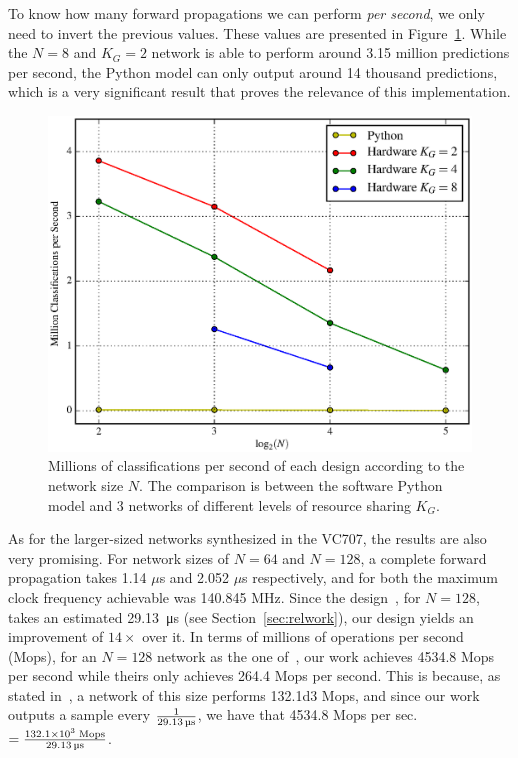 \documentclass{IEEEtran}
\begin{document}
To know how many forward propagations we can perform \emph{per second},
we only need to invert the previous values. These values are presented in Figure~\ref{fig:Mclass-psec}. While the $N=8$ and $K_G=2$ network is able to
perform around 3.15 million predictions per second, the Python model can only output around 14 thousand predictions, which is a very significant result that
proves the relevance of this implementation.

\begin{figure}
    \centering
    \includegraphics[width=\linewidth]{figures/Mclass-psec.eps}
    \caption[Millions of classifications per second of each design according to the network size $N$]{Millions of classifications per second of each design according to the network size $N$. The comparison is between the software Python model and 3 networks of different levels of resource sharing $K_G$.}
    \label{fig:Mclass-psec}
\end{figure}

As for the larger-sized networks synthesized in the VC707, the results are also very promising. For network sizes of $N=64$ and $N=128$, a complete
forward propagation takes 1.14 $\mu$s and 2.052 $\mu$s respectively, and for both the maximum clock frequency achievable was 140.845 MHz. Since the
design~\cite{Chang15}, for $N=128$, takes an estimated \SI{29.13}{\micro\second} (see Section~\ref{sec:relwork}), our design yields an improvement of $14\times$
over it.
In terms of millions of operations per second (Mops), for an $N=128$ network as the one of~\cite{Chang15}, our work achieves \num{4534.8} Mops per second
while theirs only achieves \num{264.4} Mops per second. This is because, as stated in~\cite{Chang15}, a network of this size performs \num{132.1d3} Mops, and since
our work outputs a sample every $1 \over \SI{29.13}{\micro\second}$, we have that 4534.8 Mops per sec. $=\frac{\num{132.1d3} \; \text{Mops}}{\SI{29.13}{\micro\second}}$.
\end{document}
